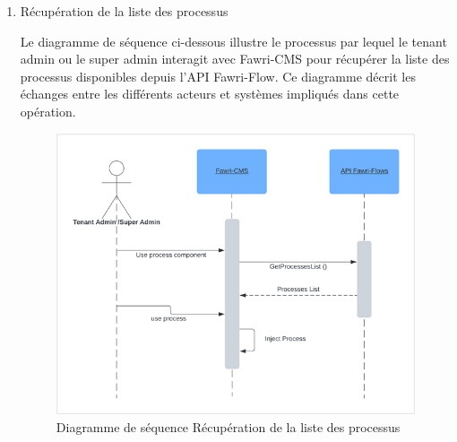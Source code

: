 \begin{enumerate}

  \item Récupération de la liste des processus

        Le diagramme de séquence ci-dessous illustre le processus par lequel le tenant admin ou le super admin interagit avec Fawri-CMS pour récupérer la liste des processus disponibles depuis l'API Fawri-Flow. Ce diagramme décrit les échanges entre les différents acteurs et systèmes impliqués dans cette opération.


        \begin{figure}[H]
          \centering
          \includegraphics[width=11cm]{Figures/Diagramme_sequence _Recuperation_list_proc.png}
          \caption{Diagramme de séquence  Récupération de la liste des processus}
        \end{figure}



\end{enumerate}

